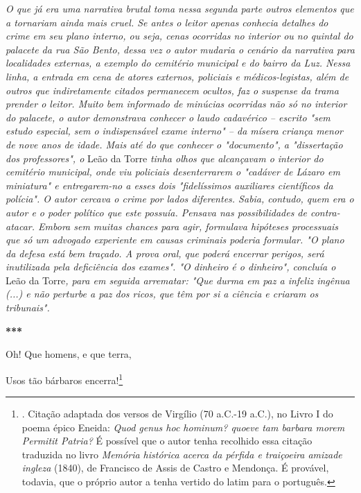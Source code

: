 \emph{O que já era uma narrativa brutal toma nessa segunda parte outros
elementos que a tornariam ainda mais cruel. Se antes o leitor apenas
conhecia detalhes do crime em seu plano interno, ou seja, cenas
ocorridas no interior ou no quintal do palacete da rua São Bento, dessa
vez o autor mudaria o cenário da narrativa para localidades externas, a
exemplo do cemitério municipal e do bairro da Luz. Nessa linha, a
entrada em cena de atores externos, policiais e médicos-legistas, além
de outros que indiretamente citados permanecem ocultos, faz o suspense
da trama prender o leitor. Muito bem informado de minúcias ocorridas não
só no interior do palacete, o autor demonstrava conhecer o laudo
cadavérico -- escrito "sem estudo especial, sem o indispensável exame
interno" -- da mísera criança menor de nove anos de idade. Mais até do
que conhecer o "documento", a "dissertação dos professores", o} Leão da
Torre \emph{tinha olhos que alcançavam o interior do cemitério
municipal, onde viu policiais desenterrarem o "cadáver de Lázaro em
miniatura" e entregarem-no a esses dois "fidelíssimos auxiliares
científicos da polícia". O autor cercava o crime por lados diferentes.
Sabia, contudo, quem era o autor e o poder político que este possuía.
Pensava nas possibilidades de contra-atacar. Embora sem muitas chances
para agir, formulava hipóteses processuais que só um advogado experiente
em causas criminais poderia formular. "O plano da defesa está bem
traçado. A prova oral, que poderá encerrar perigos, será inutilizada
pela deficiência dos exames". "O dinheiro é o dinheiro", concluía o}
Leão da Torre\emph{, para em seguida arrematar: "Que durma em paz a
infeliz ingênua (...) e não perturbe a paz dos ricos, que têm por si a
ciência e criaram os tribunais". }

\textbf{***}

Oh! Que homens, e que terra,

Usos tão bárbaros encerra!\footnote{. Citação adaptada dos versos de
  Virgílio (70 a.C.-19 a.C.), no Livro I do poema épico Eneida:
  \emph{Quod genus hoc hominum? quoeve tam barbara morem Permitit
  Patria?} É possível que o autor tenha recolhido essa citação traduzida
  no livro \emph{Memória histórica acerca da pérfida e traiçoeira
  amizade ingleza} (1840), de Francisco de Assis de Castro e Mendonça. É
  provável, todavia, que o próprio autor a tenha vertido do latim para o
  português.}

